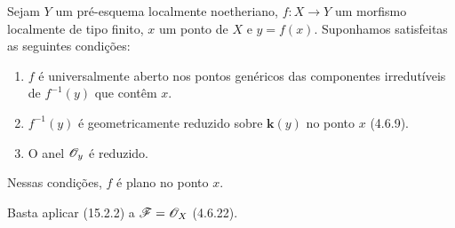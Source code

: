 \begin{corollary}[15.2.3]
\label{IV.15.2.3}
Sejam $Y$ um pré-esquema localmente noetheriano, $f:X\to Y$ um morfismo localmente de tipo finito, $x$ um ponto de $X$ e $y=f(x)$. Suponhamos satisfeitas as seguintes condições:
\begin{enumerate}[label=(\roman*)]
  \item $f$ é universalmente aberto nos pontos genéricos das componentes irredutíveis de $f^{-1}(y)$ que contêm $x$.
  \item $f^{-1}(y)$ é geometricamente reduzido sobre $\mathbf{k}(y)$ no ponto $x$ (4.6.9).
  \item O anel $\mathscr{O}_y$ é reduzido.
\end{enumerate}
Nessas condições, $f$ é plano no ponto $x$.
\end{corollary}

Basta aplicar (15.2.2) a $\mathscr{F}=\mathscr{O}_X$ (4.6.22).

